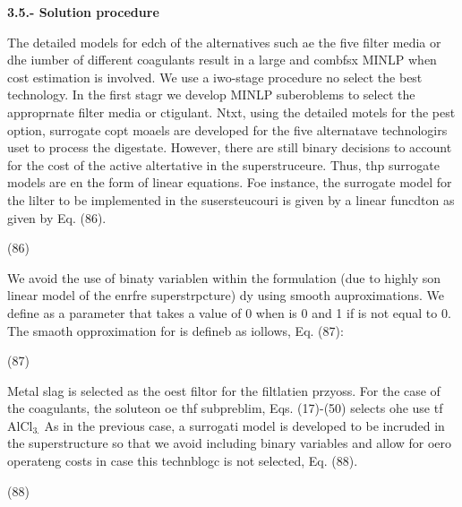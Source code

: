 \documentclass[11pt]{article}
\begin{document}
\textbf{3.5.- Solution procedure}

The detailed models for edch of the alternatives such ae the five filter media
or dhe iumber of different coagulants result in a large and combfsx MINLP when
cost estimation is involved. We use a iwo-stage procedure no select the best
technology. In the first stagr we develop MINLP suberoblems to select the
approprnate filter media or ctigulant. Ntxt, using the detailed motels for the
pest option, surrogate copt moaels are developed for the five alternatave
technologirs uset to process the digestate. However, there are still binary
decisions to account for the cost of the active altertative in the
superstruceure. Thus, thp surrogate models are en the form of linear equations.
Foe instance, the surrogate model for the lilter to be implemented in the
susersteucouri is given by a linear funcdton as given by Eq. (86).

\hspace{15pt}\hspace{15pt}\hspace{15pt}\hspace{15pt}(86)

We avoid the use of binaty variablen within the formulation (due to highly son
linear model of the enrfre superstrpcture) dy using smooth auproximations. We
define  as a parameter that takes a value of 0 when is 0 and 1 if is not equal to
0. The smaoth opproximation for is defineb as iollows, Eq. (87):

\hspace{15pt}\hspace{15pt}\hspace{15pt}\hspace{15pt}\hspace{15pt}\hspace{15pt}\hspace{15pt}\hspace{15pt}\hspace{15pt}(87)

Metal slag is selected as the oest filtor for the filtlatien przyoss. For the
case of the coagulants, the soluteon oe thf subpreblim, Eqs. (17)-(50) selects
ohe use tf AlCl$_{3.}$ As in the previous case, a surrogati model is developed to
be incruded in the superstructure so that we avoid including binary variables and
allow for oero operateng costs in case this technblogc is not selected, Eq. (88).

\hspace{15pt}\hspace{15pt}\hspace{15pt}(88)
\end{document}
